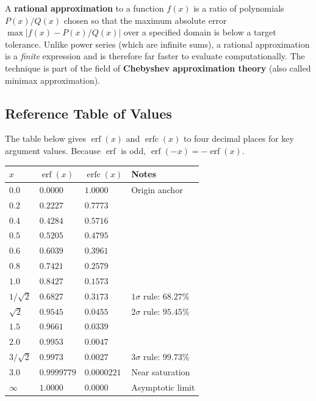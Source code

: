\documentclass[11pt]{article}
\begin{document}
\begin{defnbox}
A \textbf{rational approximation} to a function $f(x)$ is a ratio of polynomials $P(x)/Q(x)$ chosen so that the maximum absolute error $\max|f(x) - P(x)/Q(x)|$ over a specified domain is below a target tolerance. Unlike power series (which are infinite sums), a rational approximation is a \textit{finite} expression and is therefore far faster to evaluate computationally. The technique is part of the field of \textbf{Chebyshev approximation theory} (also called minimax approximation).
\end{defnbox}

\subsection{Reference Table of Values}

The table below gives $\operatorname{erf}(x)$ and $\operatorname{erfc}(x)$ to four decimal places for key argument values. Because $\operatorname{erf}$ is odd, $\operatorname{erf}(-x) = -\operatorname{erf}(x)$.

\begin{center}
\begin{tabular}{>{\centering\arraybackslash}p{1.8cm}
                >{\centering\arraybackslash}p{2.8cm}
                >{\centering\arraybackslash}p{2.8cm}
                >{\centering\arraybackslash}p{3.6cm}}
\toprule
$x$ & $\operatorname{erf}(x)$ & $\operatorname{erfc}(x)$ & Notes \\
\midrule
$0.0$ & $0.0000$ & $1.0000$ & Origin anchor \\
$0.2$ & $0.2227$ & $0.7773$ & \\
$0.4$ & $0.4284$ & $0.5716$ & \\
$0.5$ & $0.5205$ & $0.4795$ & \\
$0.6$ & $0.6039$ & $0.3961$ & \\
$0.8$ & $0.7421$ & $0.2579$ & \\
$1.0$ & $0.8427$ & $0.1573$ & \\
$1/\sqrt{2}$ & $0.6827$ & $0.3173$ & $1\sigma$ rule: $68.27\%$ \\
$\sqrt{2}$   & $0.9545$ & $0.0455$ & $2\sigma$ rule: $95.45\%$ \\
$1.5$ & $0.9661$ & $0.0339$ & \\
$2.0$ & $0.9953$ & $0.0047$ & \\
$3/\sqrt{2}$ & $0.9973$ & $0.0027$ & $3\sigma$ rule: $99.73\%$ \\
$3.0$ & $0.9999779$ & $0.0000221$ & Near saturation \\
$\infty$ & $1.0000$ & $0.0000$ & Asymptotic limit \\
\bottomrule
\end{tabular}
\end{center}
\end{document}
